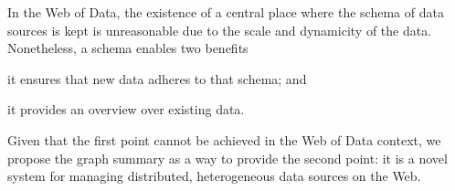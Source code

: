 In the Web of Data, the existence of a central place where the schema of data sources is kept is unreasonable due to the scale and dynamicity of the data.
Nonetheless, a schema enables two benefits
\begin{inparaenum}[(1)]
\item it ensures that new data adheres to that schema; and
\item it provides an overview over existing data.
\end{inparaenum}
Given that the first point cannot be achieved in the Web of Data context, we propose the graph summary as a way to provide the second point: it is a novel system for managing distributed, heterogeneous data sources on the Web.

%
%
%
%
%
